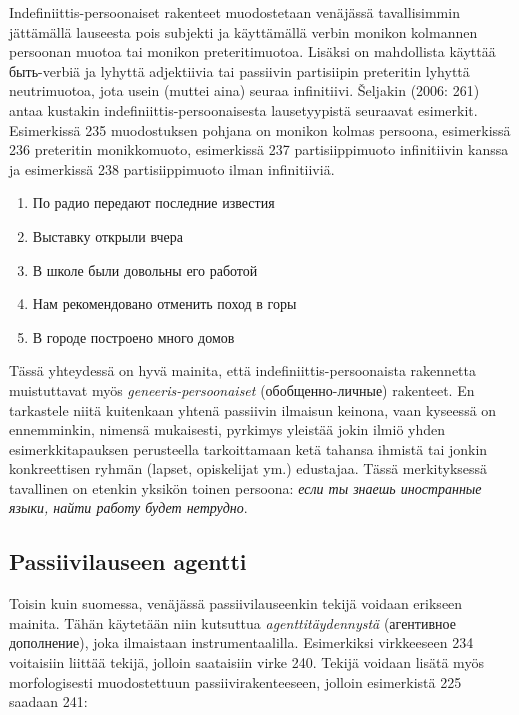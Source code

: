 \documentclass[]{scrreprt}
\providecommand{\tightlist}{%
  \setlength{\itemsep}{0pt}\setlength{\parskip}{0pt}}
\begin{document}
Indefiniittis-persoonaiset rakenteet muodostetaan venäjässä
tavallisimmin jättämällä lauseesta pois subjekti ja käyttämällä verbin
monikon kolmannen persoonan muotoa tai monikon preteritimuotoa. Lisäksi
on mahdollista käyttää быть-verbiä ja lyhyttä adjektiivia tai passiivin
partisiipin preteritin lyhyttä neutrimuotoa, jota usein (muttei aina)
seuraa infinitiivi. Šeljakin (2006: 261) antaa kustakin
indefiniittis-persoonaisesta lausetyypistä seuraavat esimerkit.
Esimerkissä 235 muodostuksen pohjana on monikon kolmas persoona,
esimerkissä 236 preteritin monikkomuoto, esimerkissä 237
partisiippimuoto infinitiivin kanssa ja esimerkissä 238 partisiippimuoto
ilman infinitiiviä.

\begin{enumerate}
\def\labelenumi{(\arabic{enumi})}
\setcounter{enumi}{234}
\tightlist
\item
  По радио передают последние известия
\item
  Выставку открыли вчера
\item
  В школе были довольны его работой
\item
  Нам рекомендовано отменить поход в горы
\item
  В городе построено много домов
\end{enumerate}

Tässä yhteydessä on hyvä mainita, että indefiniittis-persoonaista
rakennetta muistuttavat myös \emph{geneeris-persoonaiset}
(обобщенно-личные) rakenteet. En tarkastele niitä kuitenkaan yhtenä
passiivin ilmaisun keinona, vaan kyseessä on ennemminkin, nimensä
mukaisesti, pyrkimys yleistää jokin ilmiö yhden esimerkkitapauksen
perusteella tarkoittamaan ketä tahansa ihmistä tai jonkin konkreettisen
ryhmän (lapset, opiskelijat ym.) edustajaa. Tässä merkityksessä
tavallinen on etenkin yksikön toinen persoona: \emph{если ты знаешь
иностранные языки, найти работу будет нетрудно}.

\subsection{Passiivilauseen agentti}\label{passiivilauseen-agentti}

Toisin kuin suomessa, venäjässä passiivilauseenkin tekijä voidaan
erikseen mainita. Tähän käytetään niin kutsuttua
\emph{agenttitäydennystä} (агентивное дополнение), joka ilmaistaan
instrumentaalilla. Esimerkiksi virkkeeseen 234 voitaisiin liittää
tekijä, jolloin saataisiin virke 240. Tekijä voidaan lisätä myös
morfologisesti muodostettuun passiivirakenteeseen, jolloin esimerkistä
225 saadaan 241:
\end{document}
